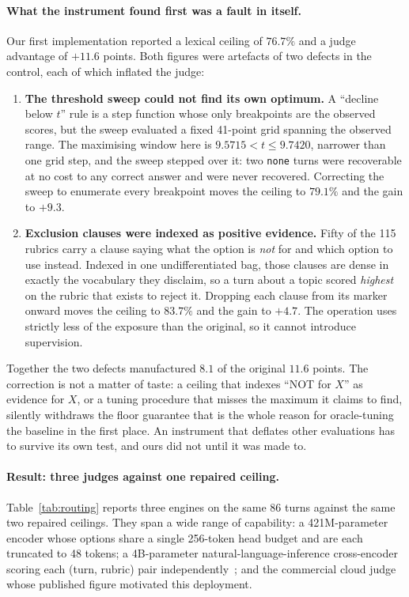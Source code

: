 \paragraph{What the instrument found first was a fault in itself.}\label{par:selffault} Our first implementation reported a lexical ceiling of $76.7\%$ and a judge advantage of $+11.6$ points. Both figures were artefacts of two defects in the control, each of which inflated the judge:

\begin{enumerate}[topsep=2pt,itemsep=2pt,leftmargin=1.6em]
\item \textbf{The threshold sweep could not find its own optimum.} A ``decline below $t$'' rule is a step function whose only breakpoints are the observed scores, but the sweep evaluated a fixed 41-point grid spanning the observed range. The maximising window here is $9.5715 < t \leq 9.7420$, narrower than one grid step, and the sweep stepped over it: two \texttt{none} turns were recoverable at no cost to any correct answer and were never recovered. Correcting the sweep to enumerate every breakpoint moves the ceiling to $79.1\%$ and the gain to $+9.3$.
\item \textbf{Exclusion clauses were indexed as positive evidence.} Fifty of the 115 rubrics carry a clause saying what the option is \emph{not} for and which option to use instead. Indexed in one undifferentiated bag, those clauses are dense in exactly the vocabulary they disclaim, so a turn about a topic scored \emph{highest} on the rubric that exists to reject it. Dropping each clause from its marker onward moves the ceiling to $83.7\%$ and the gain to $+4.7$. The operation uses strictly less of the exposure than the original, so it cannot introduce supervision.
\end{enumerate}

Together the two defects manufactured $8.1$ of the original $11.6$ points. The correction is not a matter of taste: a ceiling that indexes ``NOT for $X$'' as evidence for $X$, or a tuning procedure that misses the maximum it claims to find, silently withdraws the floor guarantee that is the whole reason for oracle-tuning the baseline in the first place. An instrument that deflates other evaluations has to survive its own test, and ours did not until it was made to.

\paragraph{Result: three judges against one repaired ceiling.} Table~\ref{tab:routing} reports three engines on the same 86 turns against the same two repaired ceilings. They span a wide range of capability: a 421M-parameter encoder whose options share a single 256-token head budget and are each truncated to 48 tokens; a 4B-parameter natural-language-inference cross-encoder scoring each (turn, rubric) pair independently~\cite{openjev2026}; and the commercial cloud judge whose published figure motivated this deployment.

